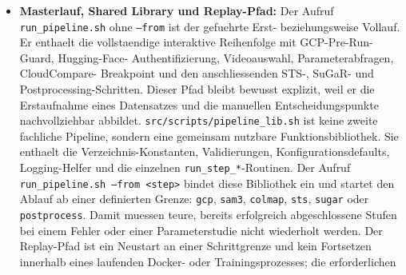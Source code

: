 \documentclass[12pt,a4paper]{article}
\begin{document}
\begin{itemize}
                dabei die radiale Verzeichnung waehrend der SfM-Ausgleichung; das
                originale Modell bleibt fuer GCP/UI und SfM-Auswertung erhalten.
                Erst danach erzeugt \texttt{run\_sfm.sh} fuer
                verzeichnungsbehaftete Modelle ueber
                \texttt{colmap image\_undistorter} eine separate ideale STS-Szene
                unter \texttt{data/04\_sfm/undistorted/}. Wird dagegen
                \texttt{PINHOLE} oder \texttt{SIMPLE\_PINHOLE} gewaehlt, wird dieser
                Schritt bewusst uebersprungen: Das Skript legt am selben Pfad nur
                eine unveraenderte Pass-through-Szene aus Bildern und Sparse-Modell
                an. Dadurch wird eine doppelte Entzerrung vermieden. Die STS-
                Uebergabe erhaelt in beiden Faellen ein ideales
                \texttt{PINHOLE}/\texttt{SIMPLE\_PINHOLE}-Modell.
            \item \textbf{Masterlauf, Shared Library und Replay-Pfad:} Der Aufruf
                \texttt{run\_pipeline.sh} ohne \texttt{--from} ist der gefuehrte
                Erst- beziehungsweise Vollauf. Er enthaelt die vollstaendige
                interaktive Reihenfolge mit GCP-Pre-Run-Guard, Hugging-Face-
                Authentifizierung, Videoauswahl, Parameterabfragen, CloudCompare-
                Breakpoint und den anschliessenden STS-, SuGaR- und
                Postprocessing-Schritten. Dieser Pfad bleibt bewusst explizit, weil
                er die Erstaufnahme eines Datensatzes und die manuellen
                Entscheidungspunkte nachvollziehbar abbildet.
                \texttt{src/scripts/pipeline\_lib.sh} ist keine zweite fachliche
                Pipeline, sondern eine gemeinsam nutzbare Funktionsbibliothek. Sie
                enthaelt die Verzeichnis-Konstanten, Validierungen,
                Konfigurationsdefaults, Logging-Helfer und die einzelnen
                \texttt{run\_step\_*}-Routinen. Der Aufruf
                \texttt{run\_pipeline.sh --from <step>} bindet diese Bibliothek ein
                und startet den Ablauf ab einer definierten Grenze:
                \texttt{gcp}, \texttt{sam3}, \texttt{colmap}, \texttt{sts},
                \texttt{sugar} oder \texttt{postprocess}. Damit muessen teure,
                bereits erfolgreich abgeschlossene Stufen bei einem Fehler oder
                einer Parameterstudie nicht wiederholt werden. Der Replay-Pfad ist
                ein Neustart an einer Schrittgrenze und kein Fortsetzen innerhalb
                eines laufenden Docker- oder Trainingsprozesses; die erforderlichen

\end{itemize}
\end{document}
